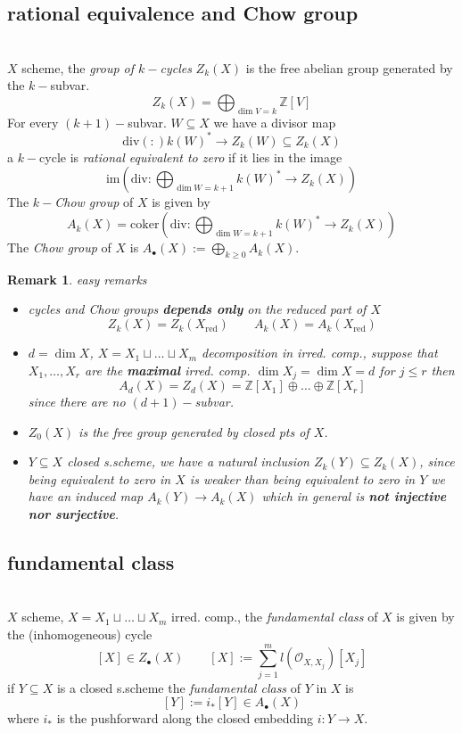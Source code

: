 \documentclass[oneside,a4paper,11pt]{amsbook}
\theoremstyle{pl}
\theoremstyle{df}
\theoremstyle{rm}
\newtheorem{rmk}{Remark}[chapter]
\newcommand{\nline}{
~\\
}%
\newcommand{\pa}[1]{
\left(#1\right)
}
\newcommand{\mc}[1]{
\mathcal{#1}
}
\newcommand{\mb}[1]{
\mathbb{#1}
}
\newcommand{\dv}[1]{
\text{div}\pa{#1}
}
\begin{document}
\subsection{rational equivalence and Chow group}
\nline

$X$ scheme, the \emph{group of $k-$cycles} $Z_k(X)$ is the free abelian group generated by the $k-$subvar.
\[
Z_k(X)=\bigoplus_{\dim V=k}{\mb{Z}[V]}
\]
For every $(k+1)-$subvar. $W\subseteq X$ we have a divisor map
\[
\dv:k(W)^*\rightarrow Z_k(W)\subseteq Z_k(X)
\]
a $k-$cycle is \emph{rational equivalent to zero} if it lies in the image
\[
\text{im}\pa{\text{div}:\bigoplus_{\dim W=k+1}{k(W)^*}\longrightarrow Z_k(X)}
\]
The \emph{$k-$Chow group} of $X$ is given by
\[
A_k(X)=\text{coker}\pa{\text{div}:\bigoplus_{\dim W=k+1}{k(W)^*}\longrightarrow Z_k(X)}
\]
The \emph{Chow group} of $X$ is $A_\bullet(X):=\bigoplus_{k\ge 0}{A_k(X)}$.

\begin{rmk}
easy remarks
\begin{itemize}
\item{cycles and Chow groups \textbf{depends only} on the reduced part of $X$
\[
Z_k(X)=Z_k(X_{\text{red}})\quad\quad A_k(X)=A_k(X_{\text{red}})
\]
}
\item{$d=\dim X$, $X=X_1\sqcup\dots\sqcup X_m$ decomposition in irred. comp., suppose that $X_1,\dots,X_r$ are the \textbf{maximal} irred. comp. $\dim X_j=\dim X=d$ for $j\le r$ then
\[
A_d(X)=Z_d(X)=\mb{Z}[X_1]\oplus\dots\oplus\mb{Z}[X_r]
\]
since there are no $(d+1)-$subvar.}
\item{$Z_0(X)$ is the free group generated by closed pts of $X$.}
\item{$Y\subseteq X$ closed s.scheme, we have a natural inclusion $Z_k(Y)\subseteq Z_k(X)$, since being equivalent to zero in $X$ is weaker than being equivalent to zero in $Y$ we have an induced map $A_k(Y)\rightarrow A_k(X)$ which in general is \textbf{not injective nor surjective}.}
\end{itemize}
\end{rmk}

\subsection{fundamental class}
\nline
$X$ scheme, $X=X_1\sqcup\dots\sqcup X_m$ irred. comp., the \emph{fundamental class} of $X$ is given by the (inhomogeneous) cycle
\[
[X]\in Z_\bullet(X)\quad\quad [X]:=\sum_{j=1}^m{l\pa{\mc{O}_{X,X_j}}[X_j]}
\]
if $Y\subseteq X$ is a closed s.scheme the \emph{fundamental class} of $Y$ in $X$ is
\[
[Y]:=i_*[Y]\in A_\bullet(X)
\]
where $i_*$ is the pushforward along the closed embedding $i:Y\rightarrow X$.
\end{document}
